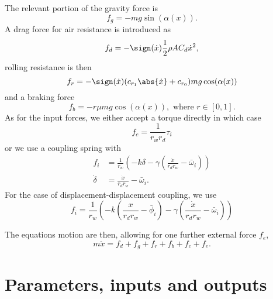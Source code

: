 \documentclass[10pt,notitlepage,abstracton]{scrartcl}
\theoremstyle{plain}
\theoremstyle{plain}
\theoremstyle{plain}
\begin{document}
The relevant portion of the gravity force is
\begin{equation}
  \label{eq:1}
  f_{g} = - m g \sin(\alpha ( x ) ).
\end{equation}
A drag force for air resistance is introduced as
\begin{equation}
  \label{eq:2}
  f_{d} = - \sign(\dot{x}) \frac{1}{2}\rho A C_{d} \dot{x}^{2},  
\end{equation}
rolling resistance is then
\begin{equation}
  \label{eq:3}
  f_{r} = - \sign(\dot{x})(c_{r_{1}}\abs{\dot{x}} + c_{r_{0}}) m g \cos(\alpha(x))
\end{equation}
and a braking force
\begin{equation}
  \label{eq:4}
  f_{b} = - r \mu m g \cos(\alpha(x)), \text{ where }   r\in[0,1].
\end{equation}
As for the input forces, we either accept a torque directly in which case
\begin{equation}
  \label{eq:5}
  f_{c} = \frac{1}{r_{w}r_{d}}\tau_{i}
\end{equation}
or we use a coupling spring with
\begin{equation}
  \label{eq:6}
  \begin{split}
    f_{i} &= \frac{1}{r_{w}} \left( -k \delta -
      \gamma( \frac{\dot{x}}{r_{d}r_{w}} - \bar{\omega}_{i} ) \right) \\
    \dot{\delta} &= \frac{\dot{x}}{r_{d}r_{w}} - \bar{\omega}_{i}. 
  \end{split}
\end{equation}
For the case of displacement-displacement coupling, we use 
\begin{equation}
  \label{eq:8}
    f_{i} = \frac{1}{r_{w}} \left( -k (\frac{x}{r_{d}r_{w}} - \bar{\phi}_{i})  -
      \gamma( \frac{\dot{x}}{r_{d}r_{w}} - \bar{\omega}_{i} ) \right) 
\end{equation}



The equations motion are then, allowing for one further external force $f_{e}$, 
\begin{equation}
  \label{eq:7}
  m\ddot{x} = f_{d} + f_{g} + f_{r} + f_{b} + f_{c} + f_{e}. 
\end{equation}


\section{Parameters, inputs and outputs}
\label{sec:param-inputs-outp}
\end{document}

